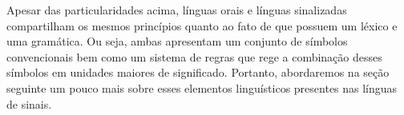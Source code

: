 Apesar das particularidades acima, línguas orais e línguas sinalizadas compartilham os mesmos princípios quanto ao fato de que possuem um léxico e uma gramática. Ou seja, ambas apresentam um conjunto de símbolos convencionais bem como um sistema de regras que rege a combinação desses símbolos em unidades maiores de significado.
Portanto, abordaremos na seção seguinte um pouco mais sobre esses elementos linguísticos presentes nas línguas de sinais.

















